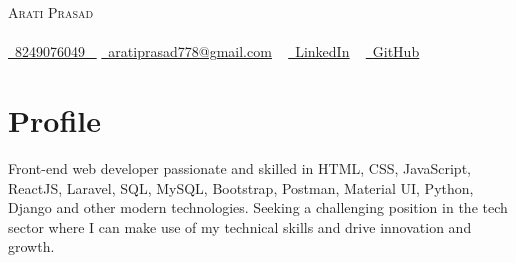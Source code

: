 \documentclass[letterpaper,11pt]{article}
\newcommand{\resumeSubHeadingListStart}{\begin{itemize}[leftmargin=0.0in, label={}]}
\newcommand{\resumeSubHeadingListEnd}{\end{itemize}}
\begin{document}


\begin{center}
    {\Huge \scshape Arati Prasad} \\ \vspace{1pt}
     \\ \vspace{1pt}
    \small \href{tel:+xxxxxxxxxxxx}{ \raisebox{-0.1\height}\faPhone\ \underline{8249076049} ~} \href{mailto:yourname@gmail.com}{\raisebox{-0.2\height}\faEnvelope\  \underline{aratiprasad778@gmail.com}} ~ 
    \href{https://www.linkedin.com/in/aarti-prasad-149833167/}{\raisebox{-0.2\height}\faLinkedinSquare\ \underline{LinkedIn}}  ~
    \href{https://github.com/Arati778}{\raisebox{-0.2\height}\faGithub\ \underline{GitHub}} ~
    
    \vspace{-8pt}
\end{center}


\section{Profile}
  \resumeSubHeadingListStart
   
      Front-end web developer passionate and skilled in HTML, CSS, JavaScript, ReactJS, Laravel, SQL, MySQL, Bootstrap, Postman, Material UI, Python, Django and other modern technologies. Seeking a challenging position in the tech sector where I can make use of my technical skills and drive innovation and growth.




  \resumeSubHeadingListEnd




\end{document}
